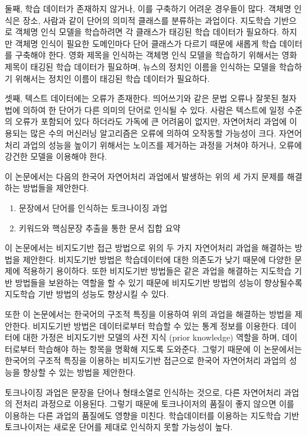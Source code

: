 \documentclass[11pt]{article}
\begin{document}
둘째, 학습 데이터가 존재하지 않거나, 이를 구축하기 어려운 경우들이 많다.
객체명 인식은 장소, 사람과 같이 단어의 의미적 클래스를 분류하는 과업이다.
지도학습 기반으로 객체명 인식 모델을 학습하려면 각 클래스가 태깅된 학습 데이터가 필요하다.
하지만 객체명 인식이 필요한 도메인마다 단어 클래스가 다르기 때문에 새롭게 학습 데이터를 구축해야 한다.
영화 제목을 인식하는 객체명 인식 모델을 학습하기 위해서는 영화 제목이 태깅된 학습 데이터가 필요하며, 뉴스의 정치인 이름을 인식하는 모델을 학습하기 위해서는 정치인 이름이 태깅된 학습 데이터가 필요하다.

셋째, 텍스트 데이터에는 오류가 존재한다.
띄어쓰기와 같은 문법 오류나 잘못된 철자법에 의하여 한 단어가 다른 의미의 단어로 인식될 수 있다.
사람은 텍스트에 일정 수준의 오류가 포함되어 있다 하더라도 가독에 큰 어려움이 없지만, 자연어처리 과업에 이용되는 많은 수의 머신러닝 알고리즘은 오류에 의하여 오작동할 가능성이 크다.
자연어처리 과업의 성능을 높이기 위해서는 노이즈를 제거하는 과정을 거쳐야 하거나, 오류에 강건한 모델을 이용해야 한다.

이 논문에서는 다음의 한국어 자연어처리 과업에서 발생하는 위의 세 가지 문제를 해결하는 방법들을 제안한다.

\begin{enumerate}[noitemsep]
    \item 문장에서 단어를 인식하는 토크나이징 과업
    \item 키워드와 핵심문장 추출을 통한 문서 집합 요약
\end{enumerate}

이 논문에서는 비지도기반 접근 방법으로 위의 두 가지 자연어처리 과업을 해결하는 방법을 제안한다.
비지도기반 방법은 학습데이터에 대한 의존도가 낮기 때문에 다양한 문제에 적용하기 용이하다.
또한 비지도기반 방법들은 같은 과업을 해결하는 지도학습 기반 방법들을 보완하는 역할을 할 수 있기 때문에 비지도기반 방법의 성능이 향상될수록 지도학습 기반 방법의 성능도 향상시킬 수 있다.

또한 이 논문에서는 한국어의 구조적 특징을 이용하여 위의 과업을 해결하는 방법을 제안한다.
비지도기반 방법은 데이터로부터 학습할 수 있는 통계 정보를 이용한다.
데이터에 대한 가정은 비지도기반 모델의 사전 지식 (prior knowledge) 역할을 하며, 데이터로부터 학습해야 하는 항목을 명확해 지도록 도와준다.
그렇기 때문에 이 논문에서는 한국어의 구조적 특징을 이용하는 비지도기반 접근으로 한국어 자연어처리 과업의 성능을 향상할 수 있는 방법을 제안한다.

토크나이징 과업은 문장을 단어나 형태소열로 인식하는 것으로, 다른 자연어처리 과업의 전처리 과정으로 이용된다.
그렇기 때문에 토크나이저의 품질이 좋지 않으면 이를 이용하는 다른 과업의 품질에도 영향을 미친다.
학습데이터를 이용하는 지도학습 기반 토크나이저는 새로운 단어를 제대로 인식하지 못할 가능성이 높다.
\end{document}
